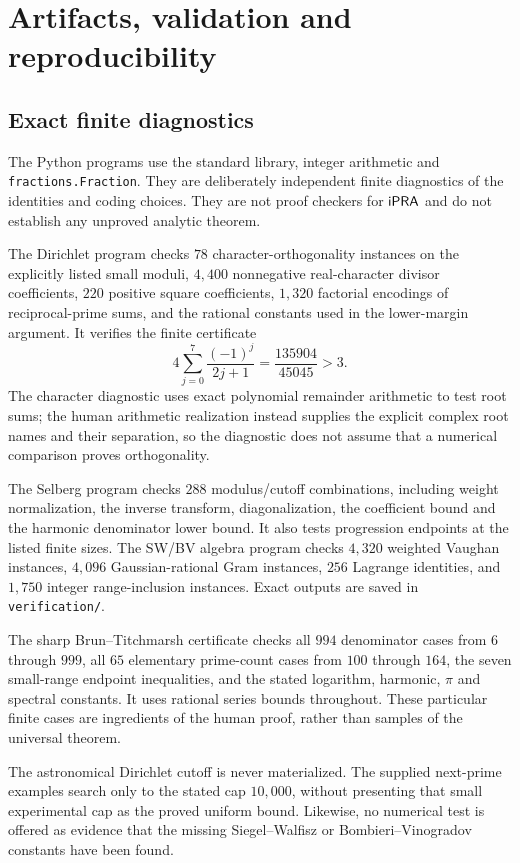 \section{Artifacts, validation and reproducibility}

\subsection{Exact finite diagnostics}

The Python programs use the standard library, integer arithmetic and
\texttt{fractions.Fraction}. They are deliberately independent finite
diagnostics of the identities and coding choices. They are not proof
checkers for $\mathsf{iPRA}$ and do not establish any unproved analytic theorem.

The Dirichlet program checks $78$ character-orthogonality instances on
the explicitly listed small moduli, $4{,}400$ nonnegative real-character
divisor coefficients, $220$ positive square coefficients, $1{,}320$
factorial encodings of reciprocal-prime sums, and the rational constants
used in the lower-margin argument. It verifies the finite certificate
\[
 4\sum_{j=0}^{7}\frac{(-1)^j}{2j+1}
 =\frac{135904}{45045}>3.
\]
The character diagnostic uses exact polynomial remainder arithmetic to
test root sums; the human arithmetic realization instead supplies the
explicit complex root names and their separation, so the diagnostic
does not assume that a numerical comparison proves orthogonality.

The Selberg program checks $288$ modulus/cutoff combinations, including
weight normalization, the inverse transform, diagonalization, the
coefficient bound and the harmonic denominator lower bound. It also
tests progression endpoints at the listed finite sizes. The SW/BV
algebra program checks $4{,}320$ weighted Vaughan instances, $4{,}096$
Gaussian-rational Gram instances, $256$ Lagrange identities, and
$1{,}750$ integer range-inclusion instances. Exact outputs are saved in
\texttt{verification/}.

The sharp Brun--Titchmarsh certificate checks all $994$ denominator cases
from $6$ through $999$, all $65$ elementary prime-count cases from $100$
through $164$, the seven small-range endpoint inequalities, and the
stated logarithm, harmonic, $\pi$ and spectral constants. It uses rational
series bounds throughout. These particular finite cases are ingredients
of the human proof, rather than samples of the universal theorem.

The astronomical Dirichlet cutoff is never materialized. The supplied
next-prime examples search only to the stated cap $10{,}000$, without
presenting that small experimental cap as the proved uniform bound.
Likewise, no numerical test is offered as evidence that the missing
Siegel--Walfisz or Bombieri--Vinogradov constants have been found.

